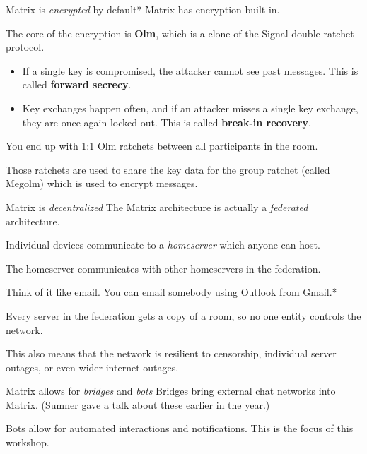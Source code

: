 \documentclass{acm}
\begin{document}
\begin{frame}{Matrix is \textit{encrypted} by default*}
    Matrix has encryption built-in.

    The core of the encryption is \textbf{Olm}, which is a clone of the Signal
    double-ratchet protocol.
    \begin{itemize}
        \item If a single key is compromised, the attacker cannot see past
            messages. This is called \textbf{forward secrecy}.
        \item Key exchanges happen often, and if an attacker misses a single key
            exchange, they are once again locked out. This is called
            \textbf{break-in recovery}.
    \end{itemize}
    \pause

    You end up with 1:1 Olm ratchets between all participants in the room.
    \pause

    Those ratchets are used to share the key data for the group ratchet (called
    Megolm) which is used to encrypt messages.
\end{frame}

\begin{frame}{Matrix is \textit{decentralized}}
    The Matrix architecture is actually a \textit{federated} architecture.

    Individual devices communicate to a \textit{homeserver} which anyone can
    host.

    The homeserver communicates with other homeservers in the federation.
    \pause

    Think of it like email. You can email somebody using Outlook from Gmail.*
    \pause

    Every server in the federation gets a copy of a room, so no one entity
    controls the network.
    \pause

    This also means that the network is resilient to censorship, individual
    server outages, or even wider internet outages.
\end{frame}

\begin{frame}{Matrix allows for \textit{bridges} and \textit{bots}}
    Bridges bring external chat networks into Matrix. (Sumner gave a talk about
    these earlier in the year.)
    \pause

    Bots allow for automated interactions and notifications. This is the focus
    of this workshop.
\end{frame}
\end{document}
